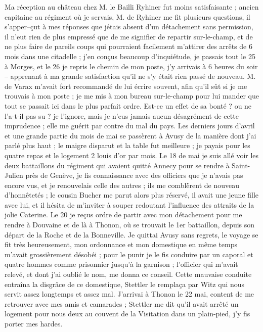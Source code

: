 \documentclass[12pt]{article}
\begin{document}
 Ma réception au château chez M. le Bailli Ryhiner fut
moins satisfaisante ; ancien capitaine au régiment où je servais, M. de Ryhiner me fit plusieurs
questions, il s’apper–çut à mes réponses que jétais absent d’un détachement sans permission, il
n’eut rien de plus empressé que de me signifier de repartir sur-le-champ, et de ne plus faire de
pareils coups qui pourraient facilement m’attirer des arrêts de 6 mois dans une citadelle ; j’en
conçus beaucoup d’inquiétude, je passais tout le 25 à Morges, et le 26 je repris le chemin de mon
poste, j’y arrivais à 6 heures du soir – apprenant à ma grande satisfaction qu’il ne s’y était rien
passé de nouveau. M. de Varax m’avait fort recommandé de lui écrire souvent, afin qu’il sût si je me
trouvais à mon poste ; je me mis à mon bureau sur-le-champ pour lui mander que tout se passait ici
dans le plus parfait ordre. Est-ce un effet de sa bonté ? ou ne l’a-t-il pas su ? je l’ignore, mais
je n’eus jamais aucun désagrément de cette imprudence ; elle me guérit par contre du mal du pays.
Les derniers jours d’avril et une grande partie du mois de mai se passèrent à Avusy de la manière
dont j’ai parlé plus haut ; le maigre disparut et la table fut meilleure ; je payais pour les quatre
repas et le logement 2 louis d’or par mois. Le 18 de mai je suis allé voir les deux battaillons du
régiment qui avaient quitté Annecy pour se rendre à Saint-Julien près de Genève, je fis connaissance
avec des officiers que je n’avais pas encore vus, et je renouvelais celle des autres ; ils me
comblè́rent de nouveau d’honnêtetés ; le cousin Bucher me parut alors plus réservé, il avait une
jeune fille avec lui, et il hésita de m’inviter à souper redoutant l’influence des attraits de la
jolie Caterine. Le 20 je reçus ordre de partir avec mon détachement pour me rendre à Douvaine et de
là à Thonon, où se trouvait le 1er battaillon, depuis son départ de la Roche et de la Bonneville. Je
quittai Avusy sans regrets, le voyage se fit très heureusement, mon ordonnance et mon domestique en
même temps m’avait grossièrement désobéi ; pour le punir je le fis conduire par un caporal et quatre
hommes comme prisonnier jusqu’à la garnison ; l’officier qui m’avait relevé, et dont j’ai oublié le
nom, me donna ce conseil. Cette mauvaise conduite entraîna la disgrâce de ce domestique, Stettler le
remplaça par Witz qui nous servit assez longtemps et assez mal. J’arrivai à Thonon le 22 mai,
content de me retrouver avec mes amis et camarades ; Stettler me dit qu’il avait arrêté un logement
pour nous deux au couvent de la Visitation dans un plain-pied, j’y fis porter mes hardes.
\end{document}
